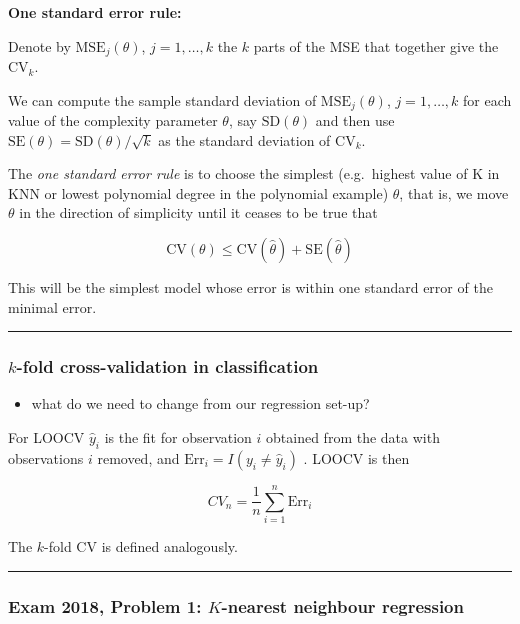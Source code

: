 \documentclass[]{article}
\providecommand{\tightlist}{%
  \setlength{\itemsep}{0pt}\setlength{\parskip}{0pt}}
\begin{document}
\textbf{One standard error rule:}

Denote by \(\text{MSE}_j(\theta)\), \(j=1,\ldots, k\) the \(k\) parts of
the MSE that together give the \(\text{CV}_k\).

We can compute the sample standard deviation of
\(\text{MSE}_j(\theta)\), \(j=1,\ldots, k\) for each value of the
complexity parameter \(\theta\), say \(\text{SD} (\theta)\) and then use
\(\text{SE}(\theta)=\text{SD}(\theta)/\sqrt{k}\) as the standard
deviation of \(\text{CV}_k\).

The \emph{one standard error rule} is to choose the simplest
(e.g.~highest value of K in KNN or lowest polynomial degree in the
polynomial example) \(\theta\), that is, we move \(\theta\) in the
direction of simplicity until it ceases to be true that

\[\text{CV}(\theta)\le \text{CV}(\hat{\theta})+ \text{SE}(\hat{\theta})\]

This will be the simplest model whose error is within one standard error
of the minimal error.

\begin{center}\rule{0.5\linewidth}{\linethickness}\end{center}

\hypertarget{k-fold-cross-validation-in-classification}{%
\subsubsection{\texorpdfstring{\(k\)-fold cross-validation in
classification}{k-fold cross-validation in classification}}\label{k-fold-cross-validation-in-classification}}

\begin{itemize}
\tightlist
\item
  what do we need to change from our regression set-up?
\end{itemize}

For LOOCV \(\hat{y}_i\) is the fit for observation \(i\) obtained from
the data with observations \(i\) removed, and
\({\text{Err}_i}=I(y_i\neq \hat{y}_i)\) . LOOCV is then

\[CV_{n}=\frac{1}{n} \sum_{i=1}^n {\text{Err}_i}\]

The \(k\)-fold CV is defined analogously.

\begin{center}\rule{0.5\linewidth}{\linethickness}\end{center}

\hypertarget{exam-2018-problem-1-k-nearest-neighbour-regression}{%
\subsubsection{\texorpdfstring{Exam 2018, Problem 1: \(K\)-nearest
neighbour
regression}{Exam 2018, Problem 1: K-nearest neighbour regression}}\label{exam-2018-problem-1-k-nearest-neighbour-regression}}
\end{document}
